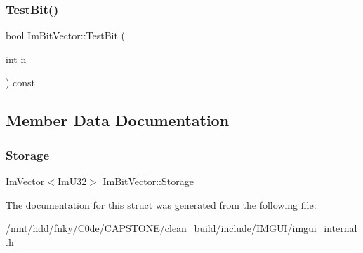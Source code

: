 \mbox{\label{structImBitVector_ac472600d0eb12fabafae58db68ab7e2b}} 
\subsubsection{\texorpdfstring{Test\+Bit()}{TestBit()}}
{\footnotesize\ttfamily bool Im\+Bit\+Vector\+::\+Test\+Bit (\begin{DoxyParamCaption}\item[{int}]{n }\end{DoxyParamCaption}) const\hspace{0.3cm}{\ttfamily [inline]}}



\subsection{Member Data Documentation}
\mbox{\label{structImBitVector_a419abda300de5270b4475eac6ce250c2}} 
\subsubsection{\texorpdfstring{Storage}{Storage}}
{\footnotesize\ttfamily \hyperlink{structImVector}{Im\+Vector}$<$Im\+U32$>$ Im\+Bit\+Vector\+::\+Storage}



The documentation for this struct was generated from the following file\+:\begin{DoxyCompactItemize}
\item 
/mnt/hdd/fnky/\+C0de/\+C\+A\+P\+S\+T\+O\+N\+E/clean\+\_\+build/include/\+I\+M\+G\+U\+I/\hyperlink{imgui__internal_8h}{imgui\+\_\+internal.\+h}\end{DoxyCompactItemize}
